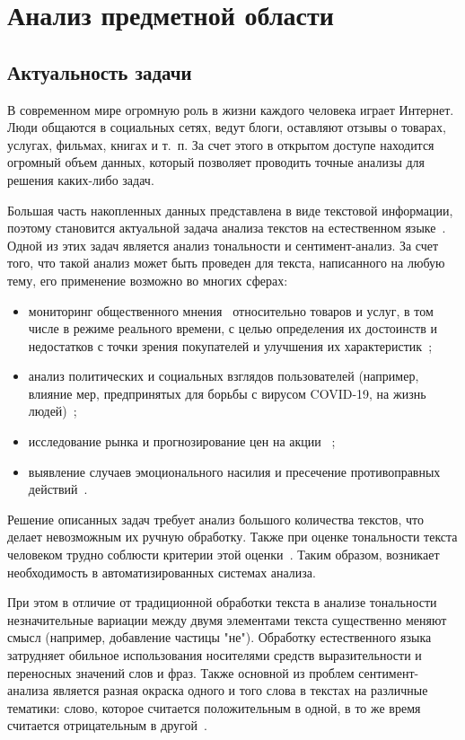 \chapter{Анализ предметной области}

\section{Актуальность задачи}

В современном мире огромную роль в жизни каждого человека играет Интернет.
Люди общаются в социальных сетях, ведут блоги, оставляют отзывы о товарах,
услугах, фильмах, книгах и т.~п. За счет этого в открытом доступе находится
огромный объем данных, который позволяет проводить точные анализы для
решения каких-либо задач.  

Большая часть накопленных данных представлена в виде текстовой информации,
поэтому становится актуальной задача анализа текстов на естественном
языке~\cite{article01}. Одной из этих задач является анализ тональности и
сентимент-анализ. За счет того, что такой анализ может быть проведен для текста,
написанного на любую тему, его применение возможно во многих сферах:
\begin{itemize}
    \item мониторинг общественного мнения~\cite{article02} относительно товаров
        и услуг, в том числе в режиме реального времени, с целью определения их
        достоинств и недостатков с точки зрения покупателей и улучшения их
        характеристик~\cite{article03};
    \item анализ политических и социальных взглядов пользователей (например,
        влияние мер, предпринятых для борьбы с вирусом COVID-19, на жизнь
        людей)~\cite{article03};
    \item исследование рынка и прогнозирование цен на акции
       ~\cite{article03};
    \item выявление случаев эмоционального насилия и пресечение
        противоправных действий~\cite{article04}.
\end{itemize}

Решение описанных задач требует анализ большого количества текстов, что делает
невозможным их ручную обработку. Также при оценке тональности текста человеком
трудно соблюсти критерии этой оценки~\cite{article02}. Таким образом, возникает
необходимость в автоматизированных системах анализа.

При этом в отличие от традиционной обработки текста в анализе тональности
незначительные вариации между двумя элементами текста существенно меняют смысл
(например, добавление частицы "не"). Обработку естественного языка затрудняет
обильное использования носителями средств выразительности и переносных значений
слов и фраз. Также основной из проблем сентимент-анализа является разная окраска
одного и того слова в текстах на различные тематики: слово, которое считается
положительным в одной, в то же время считается отрицательным в
другой~\cite{article03}.

